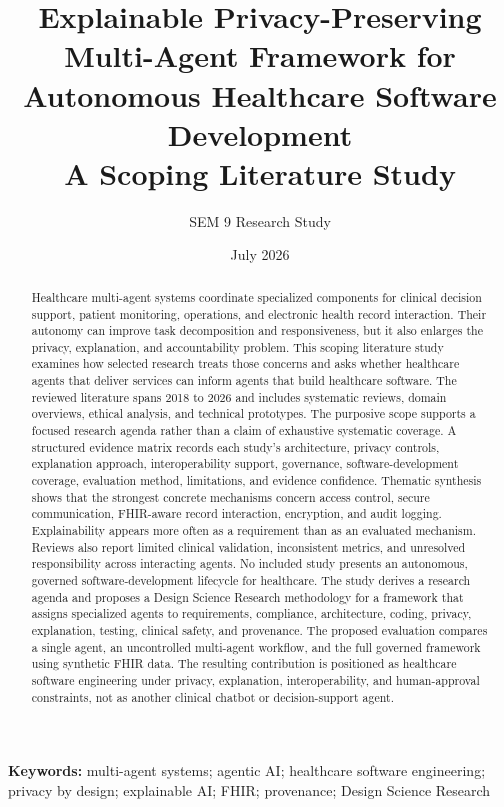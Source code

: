 \documentclass[11pt,a4paper]{article}
\title{\textbf{Explainable Privacy-Preserving Multi-Agent Framework for Autonomous Healthcare Software Development}\\[0.45em]
\large A Scoping Literature Study}
\author{SEM 9 Research Study}
\date{July 2026}
\begin{document}
\maketitle
\thispagestyle{empty}

\begin{abstract}
Healthcare multi-agent systems coordinate specialized components for clinical decision support, patient monitoring, operations, and electronic health record interaction. Their autonomy can improve task decomposition and responsiveness, but it also enlarges the privacy, explanation, and accountability problem. This scoping literature study examines how selected research treats those concerns and asks whether healthcare agents that deliver services can inform agents that build healthcare software. The reviewed literature spans 2018 to 2026 and includes systematic reviews, domain overviews, ethical analysis, and technical prototypes. The purposive scope supports a focused research agenda rather than a claim of exhaustive systematic coverage. A structured evidence matrix records each study's architecture, privacy controls, explanation approach, interoperability support, governance, software-development coverage, evaluation method, limitations, and evidence confidence. Thematic synthesis shows that the strongest concrete mechanisms concern access control, secure communication, FHIR-aware record interaction, encryption, and audit logging. Explainability appears more often as a requirement than as an evaluated mechanism. Reviews also report limited clinical validation, inconsistent metrics, and unresolved responsibility across interacting agents. No included study presents an autonomous, governed software-development lifecycle for healthcare. The study derives a research agenda and proposes a Design Science Research methodology for a framework that assigns specialized agents to requirements, compliance, architecture, coding, privacy, explanation, testing, clinical safety, and provenance. The proposed evaluation compares a single agent, an uncontrolled multi-agent workflow, and the full governed framework using synthetic FHIR data. The resulting contribution is positioned as healthcare software engineering under privacy, explanation, interoperability, and human-approval constraints, not as another clinical chatbot or decision-support agent.
\end{abstract}

\noindent\textbf{Keywords:} multi-agent systems; agentic AI; healthcare software engineering; privacy by design; explainable AI; FHIR; provenance; Design Science Research
\end{document}
